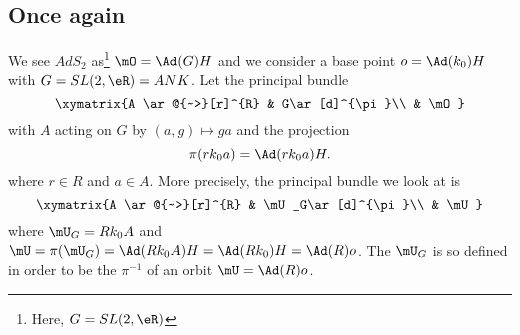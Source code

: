 \subsection{Once again}  \label{pg_DiracADsdeux}

We see $AdS_2$ as\footnote{Here, $G=SL(2,\eR)$} $\mO=\Ad(G)H$ and we consider a base point $o=\Ad(k_0)H$ with $G=SL(2,\eR)=ANK$. Let the principal bundle
\[
	\xymatrix{%
		A \ar@{~>}[r]^{R}        &   G\ar[d]^{\pi}\\
		&   \mO
	}
\]
with $A$ acting on $G$ by $(a,g)\mapsto ga$ and the projection
\begin{equation}
	\pi(rk_0a)=\Ad(rk_0a)H.
\end{equation}
where $r\in R$ and $a\in A$. More precisely, the principal bundle we look at is
\begin{equation}
	\xymatrix{%
		A \ar@{~>}[r]^{R}        &   \mU_G\ar[d]^{\pi}\\
		&   \mU
	}
\end{equation}
where $\mU_G=Rk_0A$ and $\mU=\pi(\mU_G)=\Ad(Rk_0A)H=\Ad(Rk_0)H=\Ad(R)o$. The $\mU_G$ is so defined in order to be the $\pi^{-1}$ of an orbit $\mU=\Ad(R)o$.

